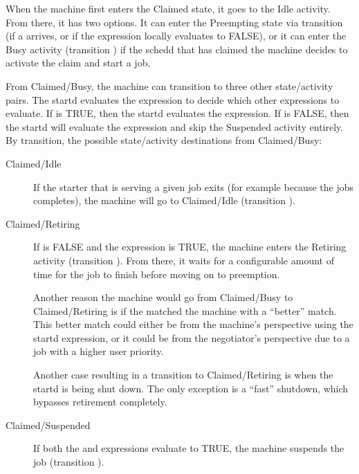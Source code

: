 When the machine first enters the Claimed state, it goes to the Idle
activity.  From there, it has two options.  
It can enter the Preempting state via transition  (if a 
 arrives, or if the  expression locally
evaluates to FALSE),  
or it can enter the Busy activity (transition ) if the
schedd that has claimed the machine decides to activate the claim and
start a job.

From Claimed/Busy, the machine can transition to three other state/activity
pairs.
The startd evaluates the  expression to decide
which other expressions to evaluate.  
If  is TRUE, then the startd evaluates the
 expression.
If  is FALSE, then the startd will
evaluate the  expression and skip the Suspended activity
entirely.
By transition, the possible state/activity destinations from Claimed/Busy:

\begin{description}
  
\item[Claimed/Idle] If the starter that is serving a given job exits
  (for example because the jobs completes), the machine will go
  to Claimed/Idle (transition ).
  
\item[Claimed/Retiring] If  is FALSE and the
   expression is TRUE, the machine enters the
  Retiring activity (transition ).  From there, it
  waits for a configurable amount of time for the job to finish
  before moving on to preemption.

  Another reason the machine would go from Claimed/Busy to
  Claimed/Retiring is if the  matched the machine
  with a ``better'' match.  This better match could either be from the
  machine's perspective using the startd  expression,
  or it could be from the negotiator's perspective due to
  a job with a higher user priority.

  Another case resulting in a transition to Claimed/Retiring is when
  the startd is being shut down.  The only exception is a ``fast''
  shutdown, which bypasses retirement completely.
  
\item[Claimed/Suspended] If both the  and
   expressions evaluate to TRUE, the machine
  suspends the job (transition ).
  
\end{description}
  
